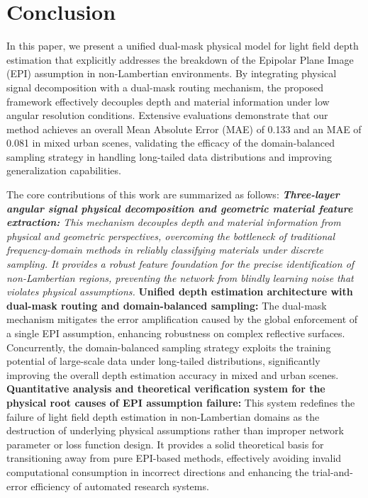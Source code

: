 \section{Conclusion}


In this paper, we present a unified dual-mask physical model for light field depth estimation that explicitly addresses the breakdown of the Epipolar Plane Image (EPI) assumption in non-Lambertian environments. By integrating physical signal decomposition with a dual-mask routing mechanism, the proposed framework effectively decouples depth and material information under low angular resolution conditions. Extensive evaluations demonstrate that our method achieves an overall Mean Absolute Error (MAE) of 0.133 and an MAE of 0.081 in mixed urban scenes, validating the efficacy of the domain-balanced sampling strategy in handling long-tailed data distributions and improving generalization capabilities.

The core contributions of this work are summarized as follows:
\textit{ \textbf{Three-layer angular signal physical decomposition and geometric material feature extraction:} This mechanism decouples depth and material information from physical and geometric perspectives, overcoming the bottleneck of traditional frequency-domain methods in reliably classifying materials under discrete sampling. It provides a robust feature foundation for the precise identification of non-Lambertian regions, preventing the network from blindly learning noise that violates physical assumptions.
} \textbf{Unified depth estimation architecture with dual-mask routing and domain-balanced sampling:} The dual-mask mechanism mitigates the error amplification caused by the global enforcement of a single EPI assumption, enhancing robustness on complex reflective surfaces. Concurrently, the domain-balanced sampling strategy exploits the training potential of large-scale data under long-tailed distributions, significantly improving the overall depth estimation accuracy in mixed and urban scenes.
\textbf{Quantitative analysis and theoretical verification system for the physical root causes of EPI assumption failure:} This system redefines the failure of light field depth estimation in non-Lambertian domains as the destruction of underlying physical assumptions rather than improper network parameter or loss function design. It provides a solid theoretical basis for transitioning away from pure EPI-based methods, effectively avoiding invalid computational consumption in incorrect directions and enhancing the trial-and-error efficiency of automated research systems.

